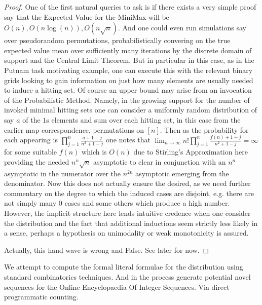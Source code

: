 \documentclass[12pt]{article}
\begin{document}
\begin{proof}
	One of the first natural queries to ask is if there exists a very simple proof say that the Expected Value for the MiniMax will be $O(n), O(n \log(n)), O(n \sqrt{n})$. And one could even run simulations say over pseudorandom permutations, probabilistically convering on the true expected value mean over sufficiently many iterations by the discrete domain of support and the Central Limit Theorem. But in particular in this case, as in the Putnam task motivating example, one can execute this with the relevant binary grids looking to gain information on just how many elements are usually needed to induce a hitting set. Of course an upper bound may arise from an invocation of the Probabilistic Method. Namely, in the growing support for the number of invoked minimal hitting sets one can consider a uniformly random distribution of say $a$ of the $1$s elements and sum over each hitting set, in this case from the earlier map correspondence, permutations on $[n]$. Then as the probability for each appearing is $\prod_{j=1}^{n} \frac{a+1-j}{n^2+1-j}$ one notes that $\lim_{n \to \infty} n! \prod_{j=1}^{n} \frac{f(n)+1-j}{n^2+1-j} = \infty$ for some suitable $f(n)$ which is $O(n)$ due to Stirling's Approximation here providing the needed $n^n \sqrt{n}$ asymptotic to clear in conjunction with an $n^n$ asymptotic in the numerator over the $n^{2n}$ asymptotic emerging from the denominator. Now this does not actually ensure the desired, as we need further commentary on the degree to which the induced cases are disjoint, e.g. there are not simply many $0$ cases and some others which produce a high number. However, the implicit structure here lends intuitive credence when one consider the distribution and the fact that additional inductions seem strictly less likely in a sense, perhaps a hypothesis on unimodality or weak monotonicity is assured.

	Actually, this hand wave is wrong and False. See later for now.
\end{proof}

\begin{theorem}\label{Thm:$d = 2$ MiniMax Distribution}
	We attempt to compute the formal literal formulae for the distribution using standard combinatorics techniques. And in the process generate potential novel sequences for the Online Encyclopaedia Of Integer Sequences. Via direct programmatic counting.
\end{theorem}
\end{document}

